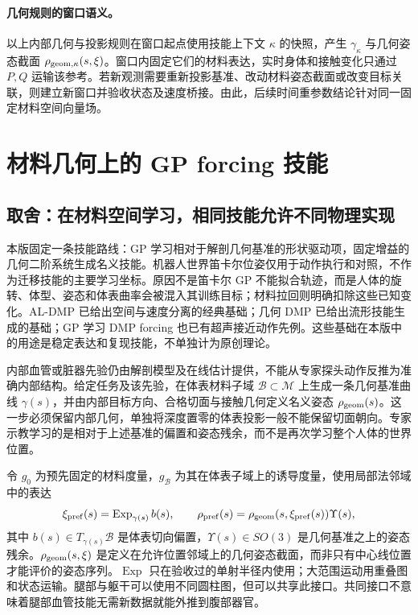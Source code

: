 \documentclass[11pt,a4paper]{article}
\numberwithin{equation}{section}
\theoremstyle{definition}
\begin{document}
\paragraph{几何规则的窗口语义。}
以上内部几何与投影规则在窗口起点使用技能上下文 $\kappa$ 的快照，产生 $\gamma_\kappa$ 与几何姿态截面 $\rho_{{\rm geom},\kappa}(s,\xi)$。窗口内固定它们的材料表达，实时身体和接触变化只通过 $P,Q$ 运输该参考。若新观测需要重新投影基准、改动材料姿态截面或改变目标关联，则建立新窗口并验收状态及速度桥接。由此，后续时间重参数结论针对同一固定材料空间向量场。


\section{材料几何上的 GP forcing 技能}\label{sec:rev:skill}
\label{sec:v43-geometric-skill}

\subsection{取舍：在材料空间学习，相同技能允许不同物理实现}
本版固定一条技能路线：GP 学习相对于解剖几何基准的形状驱动项，固定增益的几何二阶系统生成名义技能。机器人世界笛卡尔位姿仅用于动作执行和对照，不作为迁移技能的主要学习坐标。原因不是笛卡尔 GP 不能拟合轨迹，而是人体的旋转、体型、姿态和体表曲率会被混入其训练目标；材料拉回则明确扣除这些已知变化。AL-DMP 已给出空间与速度分离的经典基础\cite{aldmp2016}；几何 DMP 已给出流形技能生成的基础\cite{gdmp2024}；GP 学习 DMP forcing 也已有超声接近动作先例\cite{gpdmp2026}。这些基础在本版中的用途是稳定表达和复现技能，不单独计为原创理论。

内部血管或脏器先验仍由解剖模型及在线估计提供，不能从专家探头动作反推为准确内部结构。给定任务及该先验，在体表材料子域 $\mathcal B\subset\mathcal M$ 上生成一条几何基准曲线 $\gamma(s)$，并由内部目标方向、合格切面与接触几何定义名义姿态 $\rho_{\rm geom}(s)$。这一步必须保留内部几何，单独将深度置零的体表投影一般不能保留切面朝向。专家示教学习的是相对于上述基准的偏置和姿态残余，而不是再次学习整个人体的世界位置。

令 $g_0$ 为预先固定的材料度量，$g_{\mathcal B}$ 为其在体表子域上的诱导度量，使用局部法邻域中的表达
\begin{equation}
 \xi_{\rm pref}(s)=\operatorname{Exp}_{\gamma(s)} b(s),\qquad
 \rho_{\rm pref}(s)=\rho_{\rm geom}(s,\xi_{\rm pref}(s))\Upsilon(s),
 \label{eq:v43-skill-state}
\end{equation}
其中 $b(s)\in T_{\gamma(s)}\mathcal B$ 是体表切向偏置，$\Upsilon(s)\in SO(3)$ 是几何基准之上的姿态残余。$\rho_{\rm geom}(s,\xi)$ 是定义在允许位置邻域上的几何姿态截面，而非只有中心线位置才能评价的姿态序列。$\operatorname{Exp}$ 只在验收过的单射半径内使用；大范围运动用重叠图和状态运输。腿部与躯干可以使用不同圆柱图，但可以共享此接口。共同接口不意味着腿部血管技能无需新数据就能外推到腹部器官。
\end{document}
